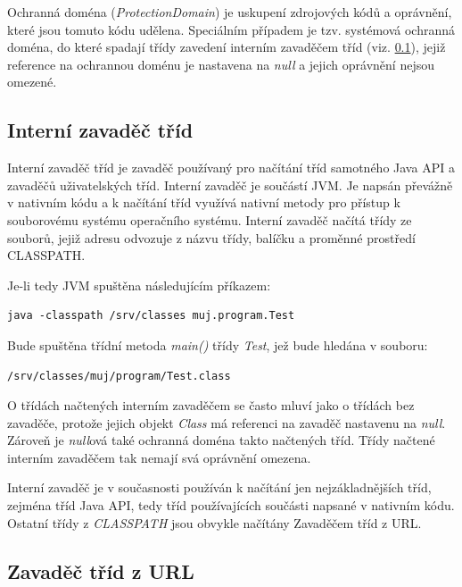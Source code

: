Ochranná doména ({\it ProtectionDomain}) je uskupení zdrojových kódů a oprávnění, které jsou tomuto kódu udělena.
Speciálním případem je tzv. systémová ochranná doména, do které spadají třídy zavedení interním zavaděčem tříd (viz. \ref{interniZavadec}), jejiž reference na ochrannou doménu je nastavena na {\it null} a jejich oprávnění nejsou omezené. \cite[5.4]{oaks}

\subsection{Interní zavaděč tříd} \label{interniZavadec}

Interní zavaděč tříd je zavaděč používaný pro načítání tříd samotného Java API a zavaděčů uživatelských tříd.
Interní zavaděč je součástí JVM. Je napsán převážně v nativním kódu a k načítání tříd využívá nativní metody pro přístup k souborovému systému operačního systému.
Interní zavaděč načítá třídy ze souborů, jejiž adresu odvozuje z názvu třídy, balíčku a proměnné prostředí CLASSPATH. \cite[3.2.1]{oaks}

Je-li tedy JVM spuštěna následujícím příkazem:

\begin{verbatim}
java -classpath /srv/classes muj.program.Test
\end{verbatim}

Bude spuštěna třídní metoda {\it main()} třídy {\it Test}, jež bude hledána v souboru:

\begin{verbatim}
/srv/classes/muj/program/Test.class
\end{verbatim}

O třídách načtených interním zavaděčem se často mluví jako o třídách bez zavaděče, protože jejich objekt {\it Class} má referenci na zavaděč nastavenu na {\it null}. \cite[3.2.1]{oaks} Zároveň je {\it null}ová také ochranná doména takto načtených tříd. Třídy načtené interním zavaděčem tak nemají svá oprávnění omezena.

Interní zavaděč je v současnosti používán k načítání jen nejzákladnějších tříd, zejména tříd Java API, tedy tříd používajících součásti napsané v nativním kódu. Ostatní třídy z {\it CLASSPATH} jsou obvykle načítány Zavaděčem tříd z URL.

\subsection{Zavaděč tříd z URL}

